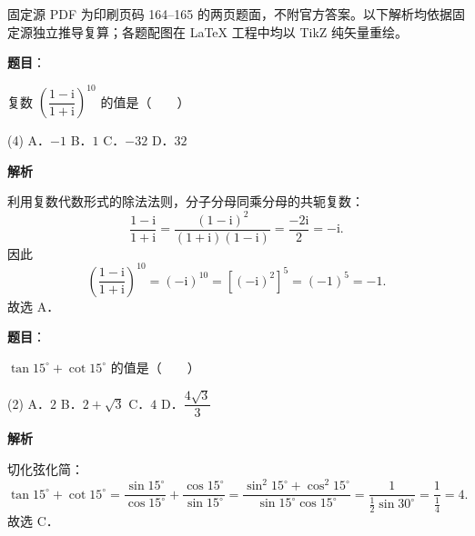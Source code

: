 

\begin{gktip}
固定源 PDF 为印刷页码 164–165 的两页题面，不附官方答案。以下解析均依据固定源独立推导复算；各题配图在 LaTeX 工程中均以 TikZ 纯矢量重绘。
\end{gktip}

\begin{answer}

\textbf{题目}：

复数 $\left(\dfrac{1-\mathrm{i}}{1+\mathrm{i}}\right)^{10}$ 的值是\mbox{（　　）}

\begin{gkopts}(4)
\task A．$-1$
\task B．$1$
\task C．$-32$
\task D．$32$
\end{gkopts}

\textbf{解析}

利用复数代数形式的除法法则，分子分母同乘分母的共轭复数：
\nopagebreak[4]
\[
\frac{1-\mathrm{i}}{1+\mathrm{i}} = \frac{(1-\mathrm{i})^2}{(1+\mathrm{i})(1-\mathrm{i})} = \frac{-2\mathrm{i}}{2} = -\mathrm{i}.
\]
因此
\nopagebreak[4]
\[
\left(\frac{1-\mathrm{i}}{1+\mathrm{i}}\right)^{10} = (-\mathrm{i})^{10} = \left[(-\mathrm{i})^2\right]^5 = (-1)^5 = -1.
\]
故选 A．


\end{answer}
\begin{answer}

\textbf{题目}：

$\tan 15^\circ + \cot 15^\circ$ 的值是\mbox{（　　）}

\begin{gkopts}(2)
\task A．$2$
\task B．$2 + \sqrt{3}$
\task C．$4$
\task D．$\dfrac{4\sqrt{3}}{3}$
\end{gkopts}

\textbf{解析}

切化弦化简：
\nopagebreak[4]
\[
\tan 15^\circ + \cot 15^\circ = \frac{\sin 15^\circ}{\cos 15^\circ} + \frac{\cos 15^\circ}{\sin 15^\circ} = \frac{\sin^2 15^\circ + \cos^2 15^\circ}{\sin 15^\circ \cos 15^\circ} = \frac{1}{\frac{1}{2}\sin 30^\circ} = \frac{1}{\frac{1}{4}} = 4.
\]
故选 C．


\end{answer}
